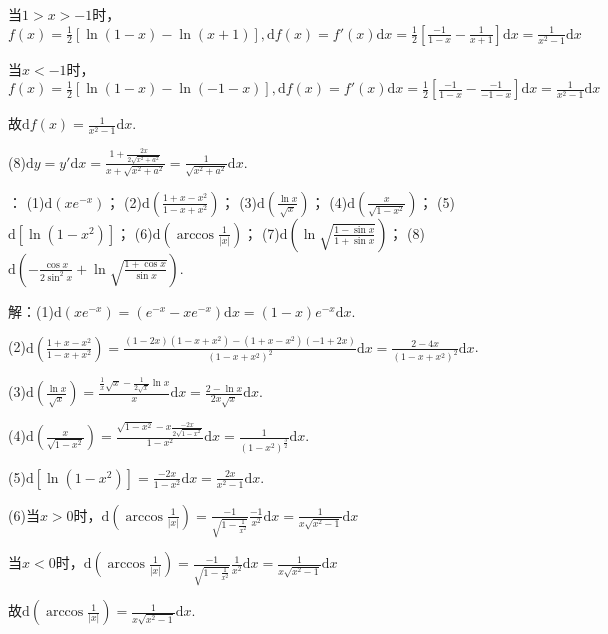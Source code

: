 \documentclass[12pt,UTF8]{ctexart}
\begin{document}
\begin{enumerate}
当$1>x>-1$时，$f(x)=\frac12[\ln(1-x)-\ln(x+1)],\mathrm df(x)=f'(x)\mathrm dx=\frac12[\frac{-1}{1-x}-\frac1{x+1}]\mathrm dx=\frac1{x^2-1}\mathrm dx$

当$x<-1$时，$f(x)=\frac12[\ln(1-x)-\ln(-1-x)],\mathrm df(x)=f'(x)\mathrm dx=\frac12[\frac{-1}{1-x}-\frac{-1}{-1-x}]\mathrm dx=\frac1{x^2-1}\mathrm dx$

故$\mathrm df(x)=\frac1{x^2-1}\mathrm dx$.

(8)$\mathrm dy=y'\mathrm dx=\frac{1+\frac{2x}{2\sqrt{x^2+a^2}}}{x+\sqrt{x^2+a^2}}=\frac1{\sqrt{x^2+a^2}}\mathrm dx$.

：
\newline
(1)$\mathrm d(xe^{-x})$；
\newline
(2)$\mathrm d(\frac{1+x-x^2}{1-x+x^2})$；
\newline
(3)$\mathrm d(\frac{\ln x}{\sqrt x})$；
\newline
(4)$\mathrm d(\frac x{\sqrt{1-x^2}})$；
\newline
(5)$\mathrm d[\ln(1-x^2)]$；
\newline
(6)$\mathrm d(\arccos\frac1{|x|})$；
\newline
(7)$\mathrm d(\ln\sqrt{\frac{1-\sin x}{1+\sin x}})$；
\newline
(8)$\mathrm d(-\frac{\cos x}{2\sin^2x}+\ln\sqrt{\frac{1+\cos x}{\sin x}})$.

解：(1)$\mathrm  d(xe^{-x})=(e^{-x}-xe^{-x})\mathrm dx=(1-x)e^{-x}\mathrm dx$.

(2)$\mathrm d(\frac{1+x-x^2}{1-x+x^2})=\frac{(1-2x)(1-x+x^2)-(1+x-x^2)(-1+2x)}{(1-x+x^2)^2}\mathrm dx=\frac{2-4x}{(1-x+x^2)^2}\mathrm dx$.

(3)$\mathrm d(\frac{\ln x}{\sqrt x})=\frac{\frac1x\sqrt x-\frac1{2\sqrt x}\ln x}{x}\mathrm dx=\frac{2-\ln x}{2x\sqrt x}\mathrm dx$.

(4)$\mathrm d(\frac x{\sqrt{1-x^2}})=\frac{\sqrt{1-x^2}-x\frac{-2x}{2\sqrt{1-x^2}}}{1-x^2}\mathrm dx=\frac1{(1-x^2)^{\frac32}}\mathrm dx$.

(5)$\mathrm d[\ln(1-x^2)]=\frac{-2x}{1-x^2}\mathrm dx=\frac{2x}{x^2-1}\mathrm dx$.

(6)当$x>0$时，$\mathrm d(\arccos\frac1{|x|})=\frac{-1}{\sqrt{1-\frac1{x^2}}}\frac{-1}{x^2}\mathrm dx=\frac1{x\sqrt{x^2-1}}\mathrm dx$

当$x<0$时，$\mathrm d(\arccos\frac1{|x|})=\frac{-1}{\sqrt{1-\frac1{x^2}}}\frac{1}{x^2}\mathrm dx=\frac1{x\sqrt{x^2-1}}\mathrm dx$

故$\mathrm d(\arccos\frac1{|x|})=\frac1{x\sqrt{x^2-1}}\mathrm dx$.


\end{enumerate}
\end{document}
